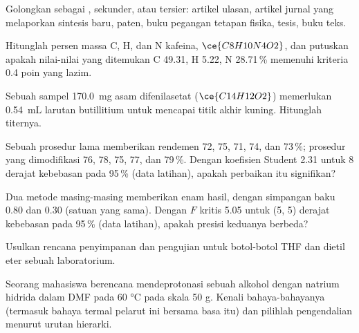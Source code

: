 \begin{exercise}[$\star$]\label{exo:b3:lab-techniques-3:4}
Golongkan sebagai , sekunder, atau tersier: artikel ulasan, artikel
jurnal yang melaporkan sintesis baru, paten, buku pegangan tetapan
fisika, tesis, buku teks.
\end{exercise}

\begin{exercise}[$\star\star$]\label{exo:b3:lab-techniques-3:5}
Hitunglah persen massa C, H, dan N kafeina, $\ce{C8H10N4O2}$, dan putuskan apakah nilai-nilai
yang ditemukan C 49.31, H 5.22, N 28.71\,\% memenuhi kriteria 0.4 poin yang lazim.
\end{exercise}

\begin{exercise}[$\star\star$]\label{exo:b3:lab-techniques-3:6}
Sebuah sampel \qty{170.0}{mg} asam difenilasetat ($\ce{C14H12O2}$) memerlukan \qty{0.54}{mL} larutan butillitium untuk mencapai
titik akhir kuning. Hitunglah titernya.
\end{exercise}

\begin{exercise}[$\star\star$]\label{exo:b3:lab-techniques-3:7}
Sebuah prosedur lama memberikan rendemen 72, 75, 71, 74, dan 73\,\%; prosedur yang dimodifikasi 76, 78, 75, 77, dan
79\,\%. Dengan koefisien Student 2.31 untuk 8 derajat kebebasan pada 95\,\% (data latihan),
apakah perbaikan itu signifikan?
\end{exercise}

\begin{exercise}[$\star\star$]\label{exo:b3:lab-techniques-3:8}
Dua metode masing-masing memberikan enam hasil, dengan simpangan baku 0.80 dan 0.30 (satuan
yang sama). Dengan $F$ kritis 5.05 untuk (5, 5) derajat kebebasan pada 95\,\% (data
latihan), apakah presisi keduanya berbeda?
\end{exercise}

\begin{exercise}[$\star\star$]\label{exo:b3:lab-techniques-3:9}
Usulkan rencana penyimpanan dan pengujian untuk botol-botol THF dan dietil eter
sebuah laboratorium.
\end{exercise}

\begin{exercise}[$\star\star\star$]\label{exo:b3:lab-techniques-3:10}
Seorang mahasiswa berencana mendeprotonasi sebuah alkohol dengan natrium hidrida dalam DMF pada 60 °C pada
skala 50 g. Kenali bahaya-bahayanya (termasuk bahaya termal pelarut ini bersama
basa itu) dan pilihlah pengendalian menurut urutan hierarki.
\end{exercise}

